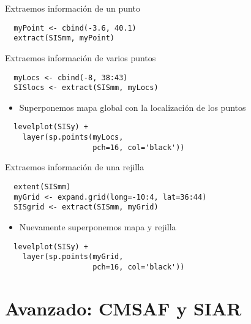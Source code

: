 \documentclass[xcolor={usenames,svgnames,dvipsnames}]{beamer}
\begin{document}
\begin{frame}[fragile,label=sec-3-1]{Extraemos información de un punto}
 \lstset{language=R,label= ,caption= ,numbers=none}
\begin{lstlisting}
  myPoint <- cbind(-3.6, 40.1)
  extract(SISmm, myPoint)
\end{lstlisting}
\end{frame}
\begin{frame}[fragile,label=sec-3-2]{Extraemos información de varios puntos}
 \lstset{language=R,label= ,caption= ,numbers=none}
\begin{lstlisting}
  myLocs <- cbind(-8, 38:43)
  SISlocs <- extract(SISmm, myLocs)
\end{lstlisting}
\begin{itemize}
\item Superponemos mapa global con la localización de los puntos
\end{itemize}
\lstset{language=R,label= ,caption= ,numbers=none}
\begin{lstlisting}
  levelplot(SISy) +
    layer(sp.points(myLocs,
                    pch=16, col='black'))
\end{lstlisting}
\end{frame}
\begin{frame}[fragile,label=sec-3-3]{Extraemos información de una rejilla}
 \lstset{language=R,label= ,caption= ,numbers=none}
\begin{lstlisting}
  extent(SISmm)
  myGrid <- expand.grid(long=-10:4, lat=36:44)
  SISgrid <- extract(SISmm, myGrid)
\end{lstlisting}
\begin{itemize}
\item Nuevamente superponemos mapa y rejilla
\end{itemize}
\lstset{language=R,label= ,caption= ,numbers=none}
\begin{lstlisting}
  levelplot(SISy) +
    layer(sp.points(myGrid,
                    pch=16, col='black'))
\end{lstlisting}
\end{frame}


\section{Avanzado: CMSAF y SIAR}
\label{sec-4}
\end{document}
